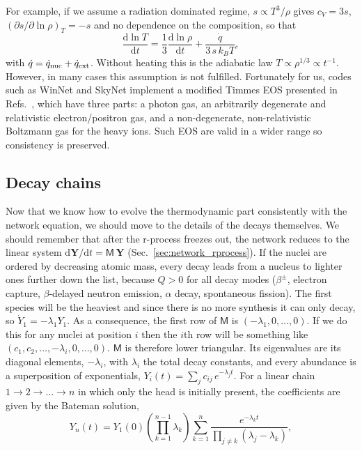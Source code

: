 For example, if we assume a radiation dominated regime, $s\propto T^3/\rho$ gives $c_V=3s$, $(\partial s/\partial\ln\rho)_T=-s$ and no dependence on the composition, so that
\begin{equation}\label{eq:T_rad}
  \frac{\mathrm{d}\ln T}{\mathrm{d}t}=\frac13\frac{\mathrm{d}\ln\rho}{\mathrm{d}t}+\frac{\dot q}{3\,s\,k_BT},
\end{equation}
with $\dot q=\dot q_{\rm nuc}+\dot q_{\rm ext}$.
Without heating this is the adiabatic law $T\propto\rho^{1/3}\propto t^{-1}$. 
However, in many cases this assumption is not fulfilled.
Fortunately for us, codes such as WinNet and SkyNet implement a modified Timmes EOS presented in Refs.~\cite{timmes_accuracy_1999,timmes_accuracy_2000}, which have three parts: a photon gas, an arbitrarily degenerate and relativistic electron/positron gas, and a non-degenerate, non-relativistic Boltzmann gas for the heavy ions.
Such EOS are valid in a wider range so consistency is preserved.

\subsection{Decay chains}\label{sec:decay_chains}

Now that we know how to evolve the thermodynamic part consistently with the network equation, we should move to the details of the decays themselves.
We should remember that after the r-process freezes out, the network reduces to the linear system $\mathrm{d}\mathbf{Y}/\mathrm{d}t=\mathsf{M}\,\mathbf{Y}$ (Sec.~\ref{sec:network_rprocess}).
If the nuclei are ordered by decreasing atomic mass, every decay leads from a nucleus to lighter ones further down the list, because $Q>0$ for all decay modes ($\beta^\pm$, electron capture, $\beta$-delayed neutron emission, $\alpha$ decay, spontaneous fission).
The first species will be the heaviest and since there is no more synthesis it can only decay, so $\dot Y_1=-\lambda_1Y_1$.
As a consequence, the first row of $\mathsf M$ is $(-\lambda_1,0,\dots,0)$.
If we do this for any nuclei at position $i$ then the $i$th row will be something like $(c_1,c_2,\dots,-\lambda_i,0,\dots,0)$.
$\mathsf{M}$ is therefore lower triangular.
Its eigenvalues are its diagonal elements, $-\lambda_i$, with $\lambda_i$ the total decay constants, and every abundance is a superposition of exponentials, $Y_i(t)=\sum_jc_{ij}\,e^{-\lambda_jt}$.
For a linear chain $1\to2\to\dots\to n$ in which only the head is initially present, the coefficients are given by the Bateman solution,
\begin{equation}\label{eq:bateman}
  Y_n(t)=Y_1(0)\left(\prod_{k=1}^{n-1}\lambda_k\right)\sum_{k=1}^{n}\frac{e^{-\lambda_kt}}{\prod_{j\neq k}(\lambda_j-\lambda_k)},
\end{equation}


